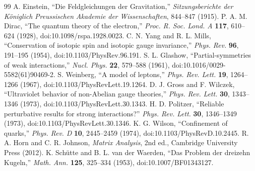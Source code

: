 \documentclass[11pt]{article}
\numberwithin{equation}{section}
\theoremstyle{remark}
\begin{document}
\begin{thebibliography}{99}
 A. Einstein, ``Die Feldgleichungen der Gravitation,'' \emph{Sitzungsberichte der K\"oniglich Preussischen Akademie der Wissenschaften}, 844--847 (1915).
 P. A. M. Dirac, ``The quantum theory of the electron,'' \emph{Proc. R. Soc. Lond. A} \textbf{117}, 610--624 (1928), doi:10.1098/rspa.1928.0023.
 C. N. Yang and R. L. Mills, ``Conservation of isotopic spin and isotopic gauge invariance,'' \emph{Phys. Rev.} \textbf{96}, 191--195 (1954), doi:10.1103/PhysRev.96.191.
 S. L. Glashow, ``Partial-symmetries of weak interactions,'' \emph{Nucl. Phys.} \textbf{22}, 579--588 (1961), doi:10.1016/0029-5582(61)90469-2.
 S. Weinberg, ``A model of leptons,'' \emph{Phys. Rev. Lett.} \textbf{19}, 1264--1266 (1967), doi:10.1103/PhysRevLett.19.1264.
 D. J. Gross and F. Wilczek, ``Ultraviolet behavior of non-Abelian gauge theories,'' \emph{Phys. Rev. Lett.} \textbf{30}, 1343--1346 (1973), doi:10.1103/PhysRevLett.30.1343.
 H. D. Politzer, ``Reliable perturbative results for strong interactions?'' \emph{Phys. Rev. Lett.} \textbf{30}, 1346--1349 (1973), doi:10.1103/PhysRevLett.30.1346.
 K. G. Wilson, ``Confinement of quarks,'' \emph{Phys. Rev. D} \textbf{10}, 2445--2459 (1974), doi:10.1103/PhysRevD.10.2445.
 R. A. Horn and C. R. Johnson, \emph{Matrix Analysis}, 2nd ed., Cambridge University Press (2012).
 K. Sch\"utte and B. L. van der Waerden, ``Das Problem der dreizehn Kugeln,'' \emph{Math. Ann.} \textbf{125}, 325--334 (1953), doi:10.1007/BF01343127.
\end{thebibliography}
\end{document}
